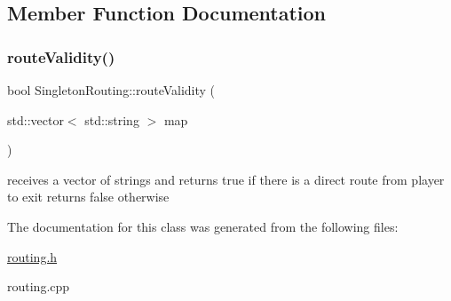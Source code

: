 \subsection{Member Function Documentation}
\hypertarget{class_singleton_routing_a2d5ddb26bf336e4877344353170bab61}{}\label{class_singleton_routing_a2d5ddb26bf336e4877344353170bab61} 
\subsubsection{\texorpdfstring{route\+Validity()}{routeValidity()}}
{\footnotesize\ttfamily bool Singleton\+Routing\+::route\+Validity (\begin{DoxyParamCaption}\item[{std\+::vector$<$ std\+::string $>$}]{map }\end{DoxyParamCaption})}

receives a vector of strings and returns true if there is a direct route from player to exit returns false otherwise 

The documentation for this class was generated from the following files\+:\begin{DoxyCompactItemize}
\item 
\hyperlink{routing_8h}{routing.\+h}\item 
routing.\+cpp\end{DoxyCompactItemize}
